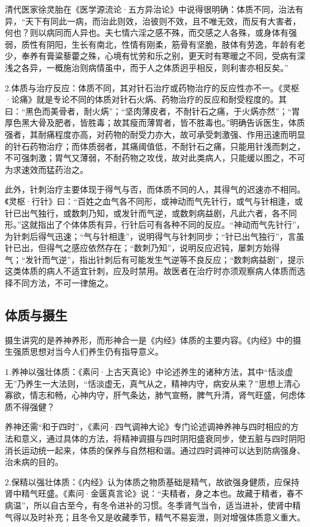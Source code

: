 \documentclass[draft,12pt]{ctexbook}
\begin{document}
清代医家徐灵胎在《医学源流论·五方异治论》中说得很明确：体质不同，治法有异，“天下有同此一病，而治此则效，治彼则不效，且不唯无效，而反有大害者，何也？则以病同而人异也。夫七情六淫之感不殊，而交感之人各殊，或身体有强弱，质性有阴阳，生长有南北，性情有刚柔，筋骨有坚脆，肢体有劳逸，年龄有老少，奉养有膏粱藜藿之殊，心境有忧劳和乐之别，更天时有寒暖之不同，受病有深浅之各异，一概施治则病情虽中，而于人之体质迥乎相反，则利害亦相反矣。”

2.体质与治疗反应：体质不同，其对针石治疗或药物治疗的反应性亦不一。《灵枢·论痛》就是专论不同的体质对针石火焫、药物治疗的反应和耐受程度的。其曰：“黑色而美骨者，耐火焫”；“坚肉薄皮者，不耐针石之痛，于火焫亦然”；“胃厚色黑大骨及肥者，皆胜毒；故其瘦而薄胃者，皆不胜毒也。”明确告诉医生，体质强者，其耐痛程度亦高，对药物的耐受力亦大，故可承受刺激强、作用迅速而明显的针石药物治疗；而体质弱者，其痛阈值低，不耐针石之痛，只能用针浅而刺之，不可强刺激；胃气又薄弱，不耐药物之攻伐，故对此类病人，只能缓以图之，不可为求速效而猛药治之。

此外，针刺治疗主要体现于得气与否，而体质不同的人，其得气的迟速亦不相同。《灵枢·行针》曰：“百姓之血气各不同形，或神动而气先针行，或气与针相逢，或针已出气独行，或数刺乃知，或发针而气逆，或数刺病益剧，凡此六者，各不同形。”这就指出了个体体质有异，行针后可有各种不同的反应。“神动而气先针行”，为针刺后得气迅速；“气与针相逢”，说明得气与针刺同步；“针已出气独行”，言虽针已出，但得气之感应依然存在；“数刺乃知”，说明反应迟钝，屡刺方始得气；“发针而气逆”，指出针刺后有可能发生气逆等不良反应；“数刺病益剧”，提示这类体质的病人不适宜针刺，应及时禁用。故医者在治疗时亦须观察病人体质而选择不同方法，不可一律施之。

\subsection{体质与摄生}%

摄生讲究的是养神养形，而形神合一是《内经》体质的主要内容。《内经》中的摄生强质思想对当今人们养生仍有指导意义。

1.养神以强壮体质：《素问·上古天真论》中论述养生的诸种方法，其中“恬淡虚无”乃养生一大法则，“恬淡虚无，真气从之，精神内守，病安从来？”思想上清心寡欲，情志和畅，心神内守，肝气条达，肺气宣畅，脾气升清，肾气旺盛，何虑体质不得强健？

养神还需“和于四时”，《素问·四气调神大论》专门论述调神养神与四时相应的方法和意义，通过具体的方法，将精神调摄与四时阴阳盛衰同步，使五脏与四时阴阳消长运动统一起来，体质的保养与自然相和谐。通过四时调神可以达到防病强身、治未病的目的。

2.保精以强壮体质：《内经》认为体质之物质基础是精气，故欲强身健质，应保持肾中精气旺盛。《素问·金匮真言论》说：“夫精者，身之本也。故藏于精者，春不病温”，所以自古至今，有冬令进补的习惯。冬季肾气当令，适当进补，使肾中精气得以及时补充；且冬令又是收藏季节，精气不易妄泄，则对增强体质意义重大。
\end{document}
